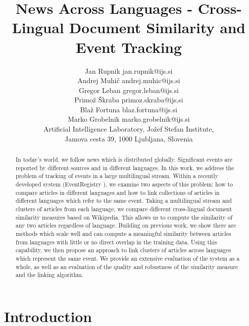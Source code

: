 \documentclass[twoside,11pt]{article}
\begin{document}
\title{News Across Languages -
Cross-Lingual Document Similarity and Event Tracking}

\author{\name Jan Rupnik \email jan.rupnik@ijs.si \\
       \name Andrej Muhi\v{c} \email andrej.muhic@ijs.si \\
       \name Gregor Leban \email gregor.leban@ijs.si \\
       \name Primo\v{z} \v{S}kraba \email primoz.skraba@ijs.si \\
       \name Bla\v{z} Fortuna \email blaz.fortuna@ijs.si \\
       \name Marko Grobelnik \email marko.grobelnik@ijs.si \\
       \addr Artificial Intelligence Laboratory, Jo\v{z}ef Stefan Institute,\\
       Jamova cesta 39, 1000 Ljubljana, Slovenia}

\maketitle

\begin{abstract}

In today's world, we follow news which is distributed globally. Significant events are reported by different sources and in different languages. In this work, we address the problem of tracking of events in a large multilingual stream. Within a recently developed system (EventRegistry  ), we examine two aspects of this problem: how to compare articles in different languages and how to link collections of articles in different languages which refer to the same event.  Taking a multilingual stream and clusters of articles from each language, we compare different cross-lingual document similarity measures based on Wikipedia. This allows us to compute the similarity of any two articles regardless of language. Building on previous work, we show there are methods which scale well and can compute a meaningful similarity between articles from languages with little or no direct overlap in the training data.
Using this capability, we then propose an approach to link clusters of articles across languages which represent the same event. We provide an extensive evaluation of the system as a whole, as well as an evaluation of the quality and robustness of the similarity measure and the linking algorithm.
\end{abstract}

\section{Introduction}
\end{document}
